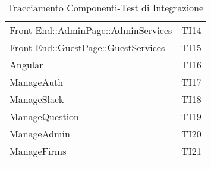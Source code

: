 \documentclass[../PianoDiQualifica_v3.0.0.tex]{subfiles}
\begin{document}
\begin{longtable}[c] { >{\centering\arraybackslash}p{11cm} >{\centering\arraybackslash}p{2cm}}
			\addlinespace[0.3em]
			\midrule
			\addlinespace[0.3em]
			Front-End::AdminPage::AdminServices & TI14\\
			\addlinespace[0.3em]
			\midrule
			\addlinespace[0.3em]
			Front-End::GuestPage::GuestServices & TI15 \\
			\addlinespace[0.3em]
			\midrule
			\addlinespace[0.3em]
			Angular & TI16\\
			\addlinespace[0.3em]
			\midrule
			\addlinespace[0.3em]
			ManageAuth & TI17 \\
			\addlinespace[0.3em]
			\midrule
			\addlinespace[0.3em]
			ManageSlack & TI18 \\
			\addlinespace[0.3em]
			\midrule
			\addlinespace[0.3em]
			ManageQuestion & TI19 \\
			\addlinespace[0.3em]
			\midrule
			\addlinespace[0.3em]
			ManageAdmin & TI20 \\
			\addlinespace[0.3em]
			\midrule
			\addlinespace[0.3em]
			ManageFirms & TI21 \\
			\bottomrule
			\caption{Tracciamento Componenti-Test di Integrazione}
	\end{longtable}

	\newpage
\end{document}
